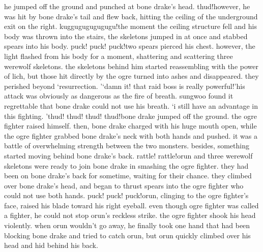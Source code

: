  he jumped off the ground and punched at bone drake’s head.
thud!however, he was hit by bone drake’s tail and flew back, hitting the ceiling of the underground exit on the right.
kuggugugugugugu!the moment the ceiling structure fell and his body was thrown into the stairs, the skeletons jumped in at once and stabbed spears into his body.
puck! puck! puck!two spears pierced his chest.
 however, the light flashed from his body for a moment, shattering and scattering three werewolf skeletons.
the skeletons behind him started reassembling with the power of lich, but those hit directly by the ogre turned into ashes and disappeared.
 they perished beyond ‘resurrection.
’‘damn it! that raid boss is really powerful!’his attack was obviously as dangerous as the fire of breath.
 sungwoo found it regrettable that bone drake could not use his breath.
‘i still have an advantage in this fighting.
’thud! thud! thud! thud!bone drake jumped off the ground.
 the ogre fighter raised himself.
then, bone drake charged with his huge mouth open, while the ogre fighter grabbed bone drake’s neck with both hands and pushed.
it was a battle of overwhelming strength between the two monsters.
 besides, something started moving behind bone drake’s back.
rattle! rattle!orun and three werewolf skeletons were ready to join bone drake in smashing the ogre fighter.
 they had been on bone drake’s back for sometime, waiting for their chance.
they climbed over bone drake’s head, and began to thrust spears into the ogre fighter who could not use both hands.
puck! puck! puck!orun, clinging to the ogre fighter’s face, raised his blade toward his right eyeball.
 even though ogre fighter was called a fighter, he could not stop orun’s reckless strike.
the ogre fighter shook his head violently.
 when orun wouldn’t go away, he finally took one hand that had been blocking bone drake and tried to catch orun, but orun quickly climbed over his head and hid behind his back.


